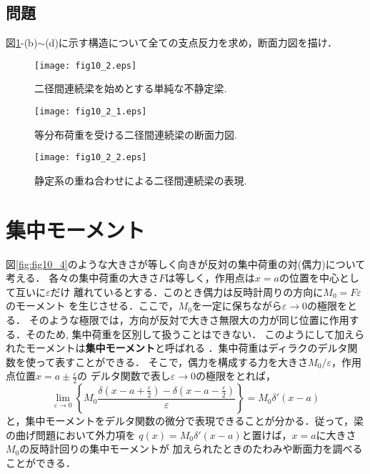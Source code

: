 \documentclass[10pt,a4j]{jbook}
\begin{document}
\subsection{問題}
図\ref{fig:fig10_2}-(b)$\sim$(d)に示す構造について全ての支点反力を求め，断面力図を描け．
\begin{figure}[h]
	\begin{center}
	\texttt{[image: fig10\_2.eps]} 
	\end{center}
	\caption{
		二径間連続梁を始めとする単純な不静定梁.
	} 
	\label{fig:fig10_2}
\end{figure}
\begin{figure}[h]
	\begin{center}
	\texttt{[image: fig10\_2\_1.eps]} 
	\end{center}
	\caption{
		等分布荷重を受ける二径間連続梁の断面力図.
	} 
	\label{fig:fig10_2_1}
\end{figure}
\begin{figure}[h]
	\begin{center}
	\texttt{[image: fig10\_2\_2.eps]} 
	\end{center}
	\caption{
		静定系の重ね合わせによる二径間連続梁の表現.
	} 
	\label{fig:fig10_2_2}
\end{figure}
\section{集中モーメント}
図\ref{fig:fig10_4}のような大きさが等しく向きが反対の集中荷重の対(偶力)について考える．
各々の集中荷重の大きさ$F$は等しく，作用点は$x=a$の位置を中心として互いに$\varepsilon$だけ
離れているとする．このとき偶力は反時計周りの方向に$M_0=F\varepsilon$のモーメント
を生じさせる．ここで，$M_0$を一定に保ちながら$\varepsilon \rightarrow 0$の極限をとる．
そのような極限では，方向が反対で大きさ無限大の力が同じ位置に作用する．そのため,
集中荷重を区別して扱うことはできない．
このようにして加えられたモーメントは{\bf 集中モーメント}と呼ばれる
．集中荷重はディラクのデルタ関数を使って表すことができる．
そこで，偶力を構成する力を大きさ$M_0/\varepsilon$，作用点位置$x=a\pm\frac{\varepsilon}{2}$の
デルタ関数で表し$\varepsilon \rightarrow 0$の極限をとれば，
\begin{equation}
	\lim_{\varepsilon \rightarrow 0} 
	\left\{
	M_0\frac{
		\delta\left(x-a+\frac{\varepsilon}{2}\right)
		-
		\delta\left(x-a-\frac{\varepsilon}{2}\right)
	}{\varepsilon}
	\right\}
	=M_0 \delta '\left( x-a \right)
\end{equation}
と，集中モーメントをデルタ関数の微分で表現できることが分かる．従って，梁の曲げ問題において外力項を
$q(x)=M_0\delta'\left(x-a\right)$と置けば，$x=a$に大きさ$M_0$の反時計回りの集中モーメントが
加えられたときのたわみや断面力を調べることができる．
\end{document}
